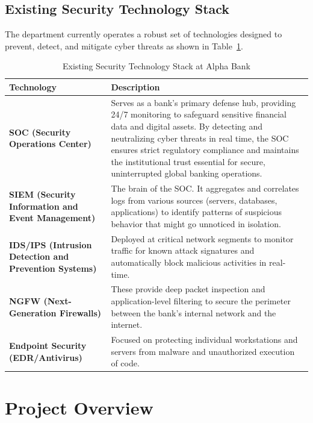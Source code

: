 \documentclass[12pt,a4paper]{report}
\begin{document}
\subsection*{Existing Security Technology Stack}

The department currently operates a robust set of technologies designed to prevent,
detect, and mitigate cyber threats as shown in Table~\ref{existing security}.

\begin{table}[H]
  \centering
  \captionsetup{singlelinecheck=false, justification=raggedright}
  \caption{Existing Security Technology Stack at Alpha Bank}
  \label{existing security}
  \renewcommand{\arraystretch}{1.4}
  \begin{tabularx}{\textwidth}{>{\bfseries}p{4.5cm} X}
    \toprule
    Technology & Description \\
    \midrule
    SOC (Security Operations Center) &
      Serves as a bank’s primary defense hub, providing 24/7 monitoring to safeguard sensitive financial data and digital assets. By detecting and neutralizing cyber threats in real time, the SOC ensures strict regulatory compliance and maintains the institutional trust essential for secure, uninterrupted global banking operations.  \\
    SIEM (Security Information and Event Management) &
      The brain of the SOC. It aggregates and correlates logs from various sources
      (servers, databases, applications) to identify patterns of suspicious behavior that
      might go unnoticed in isolation. \\
    IDS/IPS (Intrusion Detection and Prevention Systems) &
      Deployed at critical network segments to monitor traffic for known attack signatures
      and automatically block malicious activities in real-time. \\
    NGFW (Next-Generation Firewalls) &
      These provide deep packet inspection and application-level filtering to secure the
      perimeter between the bank's internal network and the internet. \\
    Endpoint Security (EDR/Antivirus) &
      Focused on protecting individual workstations and servers from malware and
      unauthorized execution of code. \\
    \bottomrule
  \end{tabularx}
\end{table}

\section{Project Overview}
\end{document}
